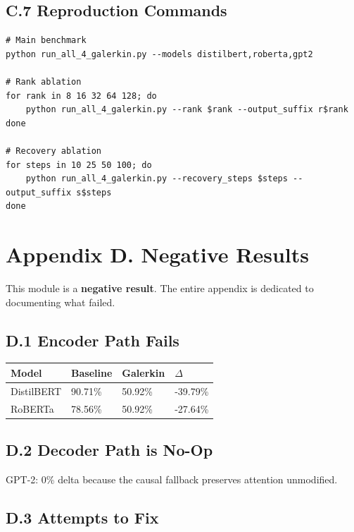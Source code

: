 \subsection{C.7 Reproduction Commands}

\begin{lstlisting}
# Main benchmark
python run_all_4_galerkin.py --models distilbert,roberta,gpt2

# Rank ablation
for rank in 8 16 32 64 128; do
    python run_all_4_galerkin.py --rank $rank --output_suffix r$rank
done

# Recovery ablation
for steps in 10 25 50 100; do
    python run_all_4_galerkin.py --recovery_steps $steps --output_suffix s$steps
done
\end{lstlisting}




\section{Appendix D. Negative Results}

This module is a \textbf{negative result}. The entire appendix is dedicated to 
documenting what failed.

\subsection{D.1 Encoder Path Fails}

\begin{table}[H]
\centering
\small
\begin{tabular}{llll}
\toprule
\textbf{Model} & \textbf{Baseline} & \textbf{Galerkin} & \textbf{$\Delta$} \\
\midrule
DistilBERT & 90.71\% & 50.92\% & -39.79\% \\
RoBERTa & 78.56\% & 50.92\% & -27.64\% \\
\bottomrule
\end{tabular}
\end{table}

\subsection{D.2 Decoder Path is No-Op}

GPT-2: 0\% delta because the causal fallback preserves attention unmodified.

\subsection{D.3 Attempts to Fix}

